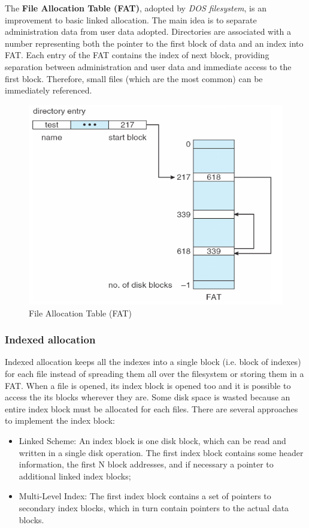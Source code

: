 The \textbf{File Allocation Table (FAT)}, adopted by \emph{DOS filesystem}, is an improvement to basic linked allocation. The main idea is to separate administration data from user data adopted. Directories are associated with a number representing both the pointer to the first block of data and an index into FAT. Each entry of the FAT contains the index of next block, providing separation between administration and user data and immediate access to the first block. Therefore, small files (which are the most common) can be immediately referenced.

\begin{figure}[hbtp]
\centering
\includegraphics[scale=0.35]{images/file_system/fat.png}
\caption{File Allocation Table (FAT)}
\end{figure}

\subsubsection{Indexed allocation}
Indexed allocation keeps all the indexes into a single block (i.e. block of indexes) for each file instead of spreading them all over the filesystem or storing them in a FAT. When a file is opened, its index block is opened too and it is possible to access the its blocks wherever they are. Some disk space is wasted because an entire index block must be allocated for each files. There are several approaches to implement the index block:
\begin{itemize}
\item Linked Scheme: An index block is one disk block, which can be read and written in a single disk operation. The first index block contains some header information, the first N block addresses, and if necessary a pointer to additional linked index blocks;
\item Multi-Level Index: The first index block contains a set of pointers to secondary index blocks, which in turn contain pointers to the actual data blocks.
\end{itemize}

